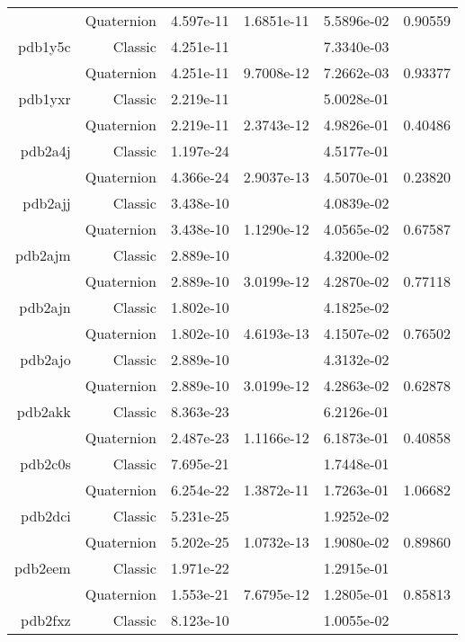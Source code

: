 \begin{xltabular}{\textwidth}{r|rS[table-format=1.3e+2]S[table-format=1.4e+2]S[table-format=1.4e+2]S[table-format=-1.5]}
& Quaternion & 4.597e-11 & 1.6851e-11 & 5.5896e-02 & 0.90559\\  \addlinespace
pdb1y5c & Classic & 4.251e-11 &  & 7.3340e-03 & \\
& Quaternion & 4.251e-11 & 9.7008e-12 & 7.2662e-03 & 0.93377\\  \addlinespace
pdb1yxr & Classic & 2.219e-11 &  & 5.0028e-01 & \\
& Quaternion & 2.219e-11 & 2.3743e-12 & 4.9826e-01 & 0.40486\\  \addlinespace
pdb2a4j & Classic & 1.197e-24 &  & 4.5177e-01 & \\
& Quaternion & 4.366e-24 & 2.9037e-13 & 4.5070e-01 & 0.23820\\  \addlinespace
pdb2ajj & Classic & 3.438e-10 &  & 4.0839e-02 & \\
& Quaternion & 3.438e-10 & 1.1290e-12 & 4.0565e-02 & 0.67587\\  \addlinespace
pdb2ajm & Classic & 2.889e-10 &  & 4.3200e-02 & \\
& Quaternion & 2.889e-10 & 3.0199e-12 & 4.2870e-02 & 0.77118\\  \addlinespace
pdb2ajn & Classic & 1.802e-10 &  & 4.1825e-02 & \\
& Quaternion & 1.802e-10 & 4.6193e-13 & 4.1507e-02 & 0.76502\\  \addlinespace
pdb2ajo & Classic & 2.889e-10 &  & 4.3132e-02 & \\
& Quaternion & 2.889e-10 & 3.0199e-12 & 4.2863e-02 & 0.62878\\  \addlinespace
pdb2akk & Classic & 8.363e-23 &  & 6.2126e-01 & \\
& Quaternion & 2.487e-23 & 1.1166e-12 & 6.1873e-01 & 0.40858\\  \addlinespace
pdb2c0s & Classic & 7.695e-21 &  & 1.7448e-01 & \\
& Quaternion & 6.254e-22 & 1.3872e-11 & 1.7263e-01 & 1.06682\\  \addlinespace
pdb2dci & Classic & 5.231e-25 &  & 1.9252e-02 & \\
& Quaternion & 5.202e-25 & 1.0732e-13 & 1.9080e-02 & 0.89860\\  \addlinespace
pdb2eem & Classic & 1.971e-22 &  & 1.2915e-01 & \\
& Quaternion & 1.553e-21 & 7.6795e-12 & 1.2805e-01 & 0.85813\\  \addlinespace
pdb2fxz & Classic & 8.123e-10 &  & 1.0055e-02 & \\

\end{xltabular}
